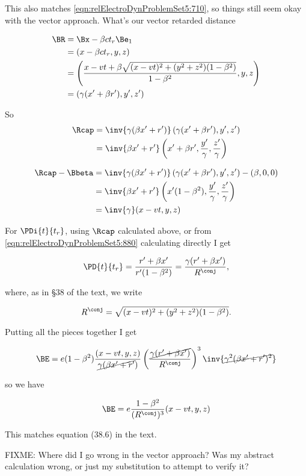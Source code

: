 This also matches \ref{eqn:relElectroDynProblemSet5:710}, so things still seem okay with the vector approach.  What's our vector retarded distance

\begin{align*}
\BR 
&= \Bx - \beta c t_r \Be_1 \\
&= (x - \beta c t_r, y, z) \\
&= \left( \frac{ x - v t + \beta \sqrt{ (x- v t)^2 + (y^2 + z^2)(1-\beta^2) } }{ 1 - \beta^2 }, y, z \right) \\
&= \left( \gamma (x' + \beta r'), y', z' \right)
\end{align*}

So 
\begin{align*}
\Rcap 
&= \inv{ \gamma (\beta x' + r') } \left( \gamma(x' + \beta r'), y', z' \right) \\
&= \inv{ \beta x' + r' } \left( x' + \beta r', \frac{y'}{\gamma}, \frac{z'}{\gamma} \right)
\end{align*}

\begin{align*}
\Rcap -\Bbeta
&= \inv{ \gamma (\beta x' + r') } \left( \gamma(x' + \beta r'), y', z' \right) - (\beta, 0, 0) \\
&= \inv{ \beta x' + r' } \left( x'(1- \beta^2), \frac{y'}{\gamma}, \frac{z'}{\gamma} \right) \\
&= \inv{\gamma} ( x - v t, y, z)
\end{align*}

For $\PDi{t}{t_r}$, using $\Rcap$ calculated above, or from \ref{eqn:relElectroDynProblemSet5:880} calculating directly I get

\begin{equation}\label{eqn:relElectroDynProblemSet5:920}
\PD{t}{t_r} = \frac{r' + \beta x'}{r'(1 - \beta^2)} = \frac{\gamma( r' + \beta x') }{R^\conj},
\end{equation}

where, as in \S 38 of the text, we write

\begin{equation}\label{eqn:relElectroDynProblemSet5:n}
R^\conj = \sqrt{ (x - vt)^2 + (y^2 + z^2)(1-\beta^2) }.
\end{equation}

Putting all the pieces together I get

\begin{align*}
\BE 
&= e (1 -\beta^2) \frac{(x - vt, y, z)}{\cancel{\gamma( \beta x' + r'})} \left( \frac{\cancel{\gamma( r' + \beta x')}}{R^\conj} \right)^3 \inv{\cancel{ \gamma^2 (\beta x' + r')^2 } } \\
\end{align*}

so we have

\begin{equation}\label{eqn:relElectroDynProblemSet5:n}
\BE 
= e \frac{1 -\beta^2}{(R^\conj)^3} (x - vt, y, z) 
\end{equation}

This matches equation (38.6) in the text.  

FIXME: Where did I go wrong in the vector approach?  Was my abstract calculation wrong, or just my substitution to attempt to verify it?

\EndArticle

